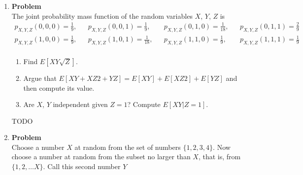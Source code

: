 \documentclass[12pt]{article}
\newenvironment{Ex}{\textbf{Problem}\vspace{.75em}\\}{}
\begin{document}
\begin{enumerate}
\begin{Ex}
      \begin{enumerate}
      \item Find $p_S(s)$ and $p_{S|A}(s)$.
      \item Find $p_{R,Y}(r,y)$.
      \item Find $p_{X|A}(x)$.
      \end{enumerate}
      \begin{solution}
        {\huge TODO}
      \end{solution}
    \end{Ex}
  \item 
    \begin{Ex}
      The joint probability mass function of the random variables
      $X$, $Y$, $Z$ is
      \begin{equation*}
        \label{eq:4-question}
        \begin{aligned}
          p_{X,Y,Z}(0,0,0) = \frac{1}{9}, && p_{X,Y,Z}(0,0,1) =
          \frac{1}{9}, && p_{X,Y,Z}(0,1,0) = \frac{1}{18}, &&
          p_{X,Y,Z}(0,1,1) = \frac{2}{9} \\
          p_{X,Y,Z}(1,0,0) = \frac{1}{9}, && p_{X,Y,Z}(1,0,1) =
          \frac{1}{18}, && p_{X,Y,Z}(1,1,0) = \frac{1}{9}, &&
          p_{X,Y,Z}(1,1,1) = \frac{1}{9} \\
        \end{aligned}
      \end{equation*}
      \begin{enumerate}
      \item Find $E[XY\sqrt{Z}]$.
      \item Argue that $E[XY +XZ2 +YZ] = E[XY]+E[XZ2]+E[YZ]$ and then
        compute its value.
      \item Are $X$, $Y$ independent given $Z=1$? Compute $E[XY|Z = 1]$.
      \end{enumerate}
      \begin{solution}
        {\huge TODO}
      \end{solution}
    \end{Ex}
  \item
    \begin{Ex}
      Choose a number $X$ at random from the set of numbers $\{1, 2,
      3, 4\}$. Now choose a number at random from the subset no larger
      than $X$, that is, from $\{1,2,\ldots X\}$. Call this second
      number $Y$
\end{Ex}
\end{enumerate}
\end{document}
